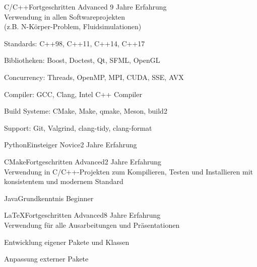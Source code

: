 \documentclass[a4paper,8pt]{cv}
\begin{document}
      \begin{multicols}{2}
        \begin{cvSkillItem}{C/C++}{Fortgeschritten}
          Advanced \hfill 9 Jahre Erfahrung \\[1pt]
          Verwendung in allen Softwareprojekten \\
          (z.B. N-Körper-Problem, Fluidsimulationen)
          \begin{cvItemize}
            \item Standards: C++98, C++11, C++14, C++17
            \item Bibliotheken: Boost, Doctest, Qt, SFML, OpenGL
            \item Concurrency: Threads, OpenMP, MPI, CUDA, SSE, AVX
            \item Compiler: GCC, Clang, Intel C++ Compiler
            \item Build Systeme: CMake, Make, qmake, Meson, build2
            \item Support: Git, Valgrind, clang-tidy, clang-format
          \end{cvItemize}
        \end{cvSkillItem}
        \begin{cvSkillItem}{Python}{Einsteiger}
          Novice\hfill 2 Jahre Erfahrung
        \end{cvSkillItem}
        \begin{cvSkillItem}{CMake}{Fortgeschritten}
          Advanced\hfill 2 Jahre Erfahrung \\[1pt]
          Verwendung in C/C++-Projekten zum Kompilieren, Testen und Installieren mit konsistentem und modernem Standard
        \end{cvSkillItem}
        \begin{cvSkillItem}{Java}{Grundkenntnis}
          Beginner
        \end{cvSkillItem}
        \begin{cvSkillItem}{LaTeX}{Fortgeschritten}
          Advanced\hfill 8 Jahre Erfahrung\\[1pt]
          Verwendung für alle Ausarbeitungen und Präsentationen
          \begin{cvItemize}
            \item Entwicklung eigener Pakete und Klassen
            \item Anpassung externer Pakete
          \end{cvItemize}
        \end{cvSkillItem}
      \end{multicols}
\end{document}
